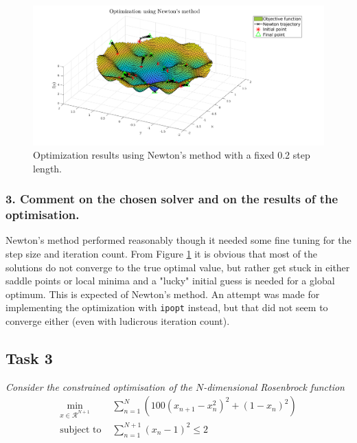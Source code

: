 \documentclass[letterpaper,12pt]{article}
\begin{document}
\begin{figure}[!htbp]
	\centering
	\includegraphics[width=1\textwidth]{img/2-2-newton.png}
	\caption{Optimization results using Newton's method with a fixed 0.2 step length.}
	\label{img:2-2-newton}
\end{figure}



\subsubsection*{3. Comment on the chosen solver and on the results of the optimisation.}
Newton's method performed reasonably though it needed some fine tuning for the step size and iteration count. From Figure \ref{img:2-2-newton} it is obvious that most of the solutions do not converge to the true optimal value, but rather get stuck in either saddle points or local minima and a "lucky" initial guess is needed for a global optimum. This is expected of Newton's method. An attempt was made for implementing the optimization with \texttt{ipopt} instead, but that did not seem to converge either (even with ludicrous iteration count).

\subsection*{Task 3}
\textit{Consider the constrained optimisation of the $N$-dimensional Rosenbrock function}
\begin{equation}
\begin{aligned}
	\min_{x\in\mathcal{R}^{N+1}} &\sum_{n=1}^N\left(100(x_{n+1} - x_n^2)^2 + (1 - x_n)^2\right) \\
	\text{subject to } &\sum_{n=1}^{N+1}(x_n - 1)^2 \leq 2
\end{aligned}
\end{equation}
\end{document}
